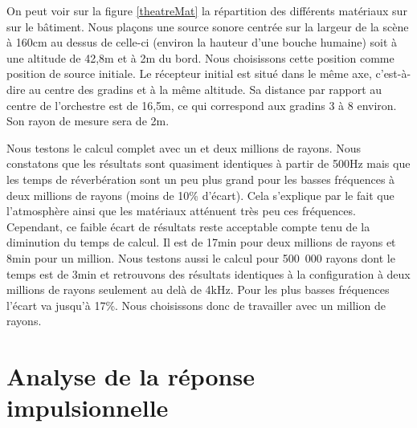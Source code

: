 On peut voir sur la figure \ref{theatreMat} la répartition des différents matériaux sur sur le bâtiment. Nous plaçons une source sonore centrée sur la largeur de la scène à 160cm au dessus de celle-ci (environ la hauteur d'une bouche humaine) soit à une altitude de 42,8m et à 2m du bord. Nous choisissons cette position comme position de source initiale. Le récepteur initial est situé dans le même axe, c'est-à-dire au centre des gradins et à la même altitude. Sa distance par rapport au centre de l'orchestre est de 16,5m, ce qui correspond aux gradins 3 à 8 environ. Son rayon de mesure sera de 2m. 

Nous testons le calcul complet avec un et deux millions de rayons. Nous constatons que les résultats sont quasiment identiques à partir de 500Hz mais que les temps de réverbération sont un peu plus grand pour les basses fréquences à deux millions de rayons (moins de 10\% d'écart). Cela s'explique par le fait que l'atmosphère ainsi que les matériaux atténuent très peu ces fréquences. Cependant, ce faible écart de résultats reste acceptable compte tenu de la diminution du temps de calcul. Il est de 17min pour deux millions de rayons et 8min pour un million. Nous testons aussi le calcul pour 500~000 rayons dont le temps est de 3min et retrouvons des résultats identiques à la configuration à deux millions de rayons seulement au delà de 4kHz. Pour les plus basses fréquences l'écart va jusqu'à 17\%. Nous choisissons donc de travailler avec un million de rayons.



\section{Analyse de la réponse impulsionnelle} \label{sect_analyse_rir}


